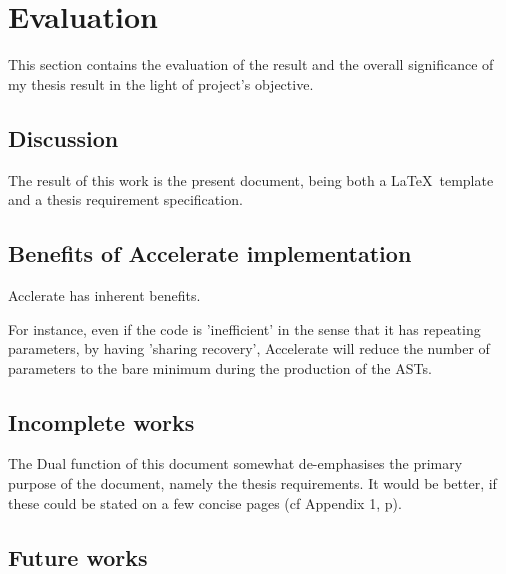 \chapter{Evaluation}\label{ch:eval}

This section contains the evaluation of the result and the overall significance of my thesis result in the light of project's objective.

\section{Discussion} \label{se:eval.discuss}

The result of this work is the present document, being both a \LaTeX\
template and a thesis requirement specification.

\section{Benefits of Accelerate implementation} \label{se:impl.benefits}

Acclerate has inherent benefits.

For instance, even if the code is 'inefficient' in the sense that it has repeating parameters, by having 'sharing recovery', Accelerate will reduce the number of parameters to the bare minimum during the production of the ASTs.

\section{Incomplete works} \label{se:eval.incomplete}

The Dual function of this document somewhat de-emphasises the primary
purpose of the document, namely the thesis requirements.  It would be
better, if these could be stated on a few concise pages (cf Appendix
1, p\pageref{app1}).

\section{Future works} \label{se:eval.future}

